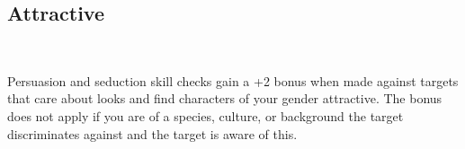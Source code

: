 \subsection*{Attractive}\label{feat:attractive}
 \\

Persuasion and seduction skill checks gain a +2 bonus when made against
targets that care about looks and find characters of your gender attractive.
The bonus does not apply if you are of a species, culture, or background the
target discriminates against and the target is aware of this.
